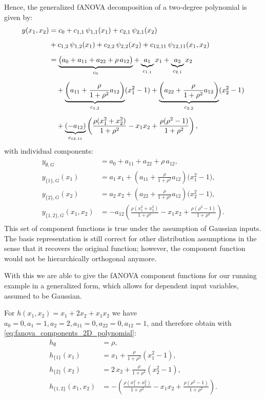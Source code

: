 Hence, the generalized fANOVA decomposition of a two-degree polynomial is given by:
\begin{align*}
y(x_1,x_2) 
&= c_0 
  + c_{1,1}\,\psi_{1,1}(x_1) 
  + c_{2,1}\,\psi_{2,1}(x_2) \\[0.5em]
&+ c_{1,2}\,\psi_{1,2}(x_1)
  + c_{2,2}\,\psi_{2,2}(x_2)
  + c_{12,11}\,\psi_{12,11}(x_1,x_2) \\[0.5em]
&= 
\underbrace{\big(a_0 + a_{11} + a_{22} + \rho\,a_{12}\big)}_{c_0} 
+ \underbrace{a_1}_{c_{1,1}} x_1
+ \underbrace{a_2}_{c_{2,1}} x_2 \\[0.5em]
&\quad 
+ \underbrace{\left(a_{11} + \frac{\rho}{1+\rho^2}a_{12}\right)}_{c_{1,2}} (x_1^2 - 1)
+ \underbrace{\left(a_{22} + \frac{\rho}{1+\rho^2}a_{12}\right)}_{c_{2,2}} (x_2^2 - 1) \notag \\[0.5em]
&\quad 
+ \underbrace{(-a_{12})}_{c_{12, 11}}\left(
    \frac{\rho(x_1^2+x_2^2)}{1+\rho^2} - x_1 x_2 
    + \frac{\rho(\rho^2-1)}{1+\rho^2}
  \right),
\end{align*}
with individual components:
\begin{align}
\begin{split}
y_{\emptyset, G} &= a_0 + a_{11} + a_{22} + \rho\,a_{12}, \\[0.5em]
y_{\{1\}, G}(x_1) &= a_1\,x_1 
  + \left(a_{11} + \frac{\rho}{1+\rho^2}a_{12}\right)\bigl(x_1^2 - 1\bigr), \\[0.5em]
y_{\{2\}, G}(x_2) &= a_2\,x_2 
  + \left(a_{22} + \frac{\rho}{1+\rho^2}a_{12}\right)\bigl(x_2^2 - 1\bigr), \\[0.5em]
y_{\{1,2\}, G}(x_1,x_2) 
&= -a_{12}\!\left(
    \frac{\rho(x_1^2+x_2^2)}{1+\rho^2} 
    - x_1 x_2 
    + \frac{\rho(\rho^2-1)}{1+\rho^2}
   \right).
\end{split}
\label{eq:fanova_components_2D_polynomial}
\end{align}
This set of component functions is true under the assumption of Gaussian inputs. The basis representation is still correct for other distribution assumptions in the sense that it recovers the original function; however, the component function would not be hierarchically orthogonal anymore.\par
With this we are able to give the fANOVA component functions for our running example in a generalized form, which allows for dependent input variables, assumed to be Gaussian.\par
For $h(x_1,x_2) = x_1 + 2x_2 + x_1 x_2$  we have $a_0 = 0, a_1 = 1, a_2 = 2, a_{11} = 0, a_{22} = 0, a_{12} = 1$, and therefore obtain with \autoref{eq:fanova_components_2D_polynomial}:
\begin{align*}
h_{\emptyset} &= \rho, \\[0.5em]
h_{\{1\}}(x_1) &= x_1 + \frac{\rho}{1+\rho^2}(x_1^2 - 1), \\[0.5em]
h_{\{2\}}(x_2) &= 2\,x_2 + \frac{\rho}{1+\rho^2}(x_2^2 - 1), \\[0.5em]
h_{\{1,2\}}(x_1,x_2) 
&= -\left(\frac{\rho(x_1^2+x_2^2)}{1+\rho^2} - x_1 x_2 + \frac{\rho(\rho^2-1)}{1+\rho^2}\right).
\end{align*}

